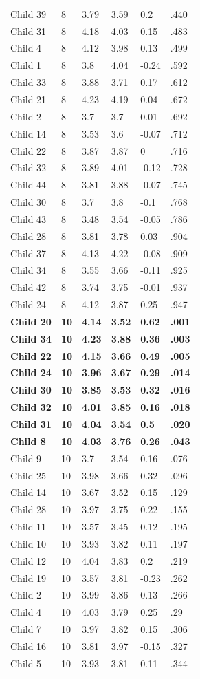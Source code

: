 \documentclass[openright,titlepage,12pt,a4paper]{book}
\begin{document}
\begin{longtable}[]{@{}llllll@{}}
Child 39 & 8 & 3.79 & 3.59 & 0.2 & .440\tabularnewline
Child 31 & 8 & 4.18 & 4.03 & 0.15 & .483\tabularnewline
Child 4 & 8 & 4.12 & 3.98 & 0.13 & .499\tabularnewline
Child 1 & 8 & 3.8 & 4.04 & -0.24 & .592\tabularnewline
Child 33 & 8 & 3.88 & 3.71 & 0.17 & .612\tabularnewline
Child 21 & 8 & 4.23 & 4.19 & 0.04 & .672\tabularnewline
Child 2 & 8 & 3.7 & 3.7 & 0.01 & .692\tabularnewline
Child 14 & 8 & 3.53 & 3.6 & -0.07 & .712\tabularnewline
Child 22 & 8 & 3.87 & 3.87 & 0 & .716\tabularnewline
Child 32 & 8 & 3.89 & 4.01 & -0.12 & .728\tabularnewline
Child 44 & 8 & 3.81 & 3.88 & -0.07 & .745\tabularnewline
Child 30 & 8 & 3.7 & 3.8 & -0.1 & .768\tabularnewline
Child 43 & 8 & 3.48 & 3.54 & -0.05 & .786\tabularnewline
Child 28 & 8 & 3.81 & 3.78 & 0.03 & .904\tabularnewline
Child 37 & 8 & 4.13 & 4.22 & -0.08 & .909\tabularnewline
Child 34 & 8 & 3.55 & 3.66 & -0.11 & .925\tabularnewline
Child 42 & 8 & 3.74 & 3.75 & -0.01 & .937\tabularnewline
Child 24 & 8 & 4.12 & 3.87 & 0.25 & .947\tabularnewline
\textbf{Child 20} & \textbf{10} & \textbf{4.14} & \textbf{3.52} & \textbf{0.62} & \textbf{.001}\tabularnewline
\textbf{Child 34} & \textbf{10} & \textbf{4.23} & \textbf{3.88} & \textbf{0.36} & \textbf{.003}\tabularnewline
\textbf{Child 22} & \textbf{10} & \textbf{4.15} & \textbf{3.66} & \textbf{0.49} & \textbf{.005}\tabularnewline
\textbf{Child 24} & \textbf{10} & \textbf{3.96} & \textbf{3.67} & \textbf{0.29} & \textbf{.014}\tabularnewline
\textbf{Child 30} & \textbf{10} & \textbf{3.85} & \textbf{3.53} & \textbf{0.32} & \textbf{.016}\tabularnewline
\textbf{Child 32} & \textbf{10} & \textbf{4.01} & \textbf{3.85} & \textbf{0.16} & \textbf{.018}\tabularnewline
\textbf{Child 31} & \textbf{10} & \textbf{4.04} & \textbf{3.54} & \textbf{0.5} & \textbf{.020}\tabularnewline
\textbf{Child 8} & \textbf{10} & \textbf{4.03} & \textbf{3.76} & \textbf{0.26} & \textbf{.043}\tabularnewline
Child 9 & 10 & 3.7 & 3.54 & 0.16 & .076\tabularnewline
Child 25 & 10 & 3.98 & 3.66 & 0.32 & .096\tabularnewline
Child 14 & 10 & 3.67 & 3.52 & 0.15 & .129\tabularnewline
Child 28 & 10 & 3.97 & 3.75 & 0.22 & .155\tabularnewline
Child 11 & 10 & 3.57 & 3.45 & 0.12 & .195\tabularnewline
Child 10 & 10 & 3.93 & 3.82 & 0.11 & .197\tabularnewline
Child 12 & 10 & 4.04 & 3.83 & 0.2 & .219\tabularnewline
Child 19 & 10 & 3.57 & 3.81 & -0.23 & .262\tabularnewline
Child 2 & 10 & 3.99 & 3.86 & 0.13 & .266\tabularnewline
Child 4 & 10 & 4.03 & 3.79 & 0.25 & .29\tabularnewline
Child 7 & 10 & 3.97 & 3.82 & 0.15 & .306\tabularnewline
Child 16 & 10 & 3.81 & 3.97 & -0.15 & .327\tabularnewline
Child 5 & 10 & 3.93 & 3.81 & 0.11 & .344\tabularnewline

\end{longtable}
\end{document}
